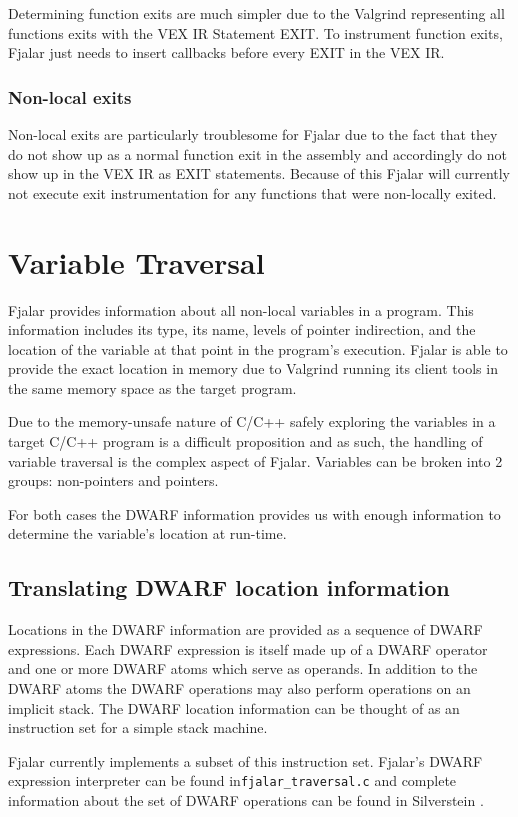 \documentclass[11pt]{article}
\begin{document}
Determining function exits are much simpler due to the Valgrind
representing all functions exits with the VEX IR Statement EXIT. To
instrument function exits, Fjalar just needs to insert callbacks
before every EXIT in the VEX IR.

\subsubsection{Non-local exits}
Non-local exits are particularly troublesome for Fjalar due to the
fact that they do not show up as a normal function exit in the
assembly and accordingly do not show up in the VEX IR as EXIT
statements. Because of this Fjalar will currently not execute exit
instrumentation for any functions that were non-locally exited.

\section{Variable Traversal}
Fjalar provides information about all non-local variables in a
program. This information includes its type, its name, levels of
pointer indirection, and the location of the variable at that point in
the program's execution. Fjalar is able to provide the exact location 
in memory due to Valgrind running its client tools in the same memory
space as the target program.

Due to the memory-unsafe nature of C/C++ safely exploring the
variables in a target C/C++ program is a difficult
proposition and as such, the handling of variable traversal is the
complex aspect of Fjalar. Variables can be broken into 2 groups:
non-pointers and pointers.

For both cases the DWARF information provides us with enough
information to determine the variable's location at run-time.

\subsection{Translating DWARF location information}
Locations in the DWARF information are provided as a sequence of DWARF
expressions. Each DWARF expression is itself made up of a DWARF
operator and one or more DWARF atoms which serve as operands. In
addition to the DWARF atoms the DWARF operations may also perform
operations on an implicit stack. The DWARF location information 
can be thought of as an instruction set for a simple stack machine.

Fjalar currently implements a subset of this instruction set. Fjalar's
DWARF expression interpreter can be found
in\texttt{fjalar\_traversal.c} and complete information about the set
of DWARF operations can be found in Silverstein
\cite{silverstein1993dwarf}.
\end{document}
